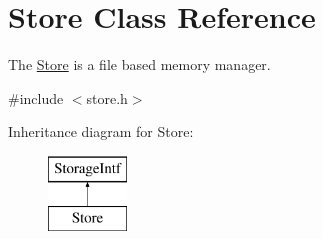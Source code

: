 \hypertarget{class_store}{}\section{Store Class Reference}
\label{class_store}


The \mbox{\hyperlink{class_store}{Store}} is a file based memory manager.  




{\ttfamily \#include $<$store.\+h$>$}

Inheritance diagram for Store\+:\begin{figure}[H]
\begin{center}
\leavevmode
\includegraphics[height=2.000000cm]{class_store}
\end{center}
\end{figure}
